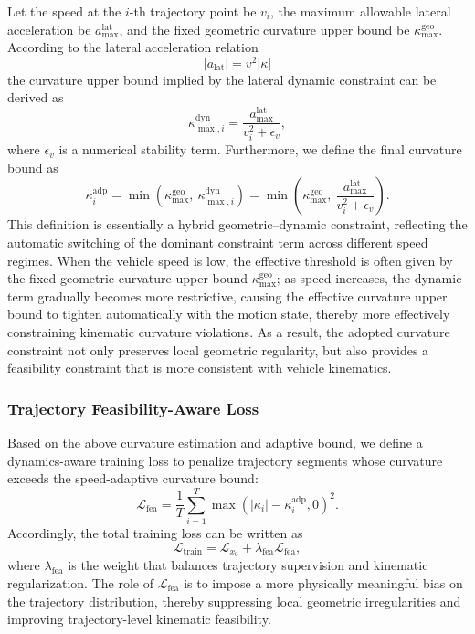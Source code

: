 \documentclass[3p,times,authoryear]{elsarticle}
\newcommand{\loss}{\mathcal{L}}
\begin{document}
Let the speed at the $i$-th trajectory point be $v_i$, the maximum allowable lateral acceleration be $a_{\max}^{\mathrm{lat}}$, and the fixed geometric curvature upper bound be $\kappa_{\max}^{\mathrm{geo}}$. According to the lateral acceleration relation
\begin{equation}
    \left| a_{\mathrm{lat}} \right| = v^2 \left| \kappa \right|
\end{equation}
the curvature upper bound implied by the lateral dynamic constraint can be derived as
\begin{equation}
    \kappa_{\max,i}^{\mathrm{dyn}} = \frac{a_{\max}^{\mathrm{lat}}}{v_i^2+\epsilon_v},
\end{equation}
where $\epsilon_v$ is a numerical stability term. Furthermore, we define the final curvature bound as
\begin{equation}
    \kappa_i^{\mathrm{adp}} =
    \min\!\left(\kappa_{\max}^{\mathrm{geo}},\ \kappa_{\max,i}^{\mathrm{dyn}}\right)
    =
    \min\!\left(\kappa_{\max}^{\mathrm{geo}},\ \frac{a_{\max}^{\mathrm{lat}}}{v_i^2+\epsilon_v}\right).
\end{equation}
This definition is essentially a hybrid geometric--dynamic constraint, reflecting the automatic switching of the dominant constraint term across different speed regimes. When the vehicle speed is low, the effective threshold is often given by the fixed geometric curvature upper bound $\kappa_{\max}^{\mathrm{geo}}$; as speed increases, the dynamic term gradually becomes more restrictive, causing the effective curvature upper bound to tighten automatically with the motion state, thereby more effectively constraining kinematic curvature violations. As a result, the adopted curvature constraint not only preserves local geometric regularity, but also provides a feasibility constraint that is more consistent with vehicle kinematics.

\subsubsection{Trajectory Feasibility-Aware Loss}

Based on the above curvature estimation and adaptive bound, we define a dynamics-aware training loss to penalize trajectory segments whose curvature exceeds the speed-adaptive curvature bound:
\begin{equation}
    \loss_{\mathrm{fea}}
    =
    \frac{1}{T}\sum_{i=1}^{T}
    \max\!\left(|\kappa_i|-\kappa_i^{\mathrm{adp}},0\right)^2.
\end{equation}
Accordingly, the total training loss can be written as
\begin{equation}
    \loss_{\mathrm{train}} = \loss_{x_0} + \lambda_{\mathrm{fea}} \loss_{\mathrm{fea}},
\end{equation}
where $\lambda_{\mathrm{fea}}$ is the weight that balances trajectory supervision and kinematic regularization. The role of $\loss_{\mathrm{fea}}$ is to impose a more physically meaningful bias on the trajectory distribution, thereby suppressing local geometric irregularities and improving trajectory-level kinematic feasibility.
\end{document}
